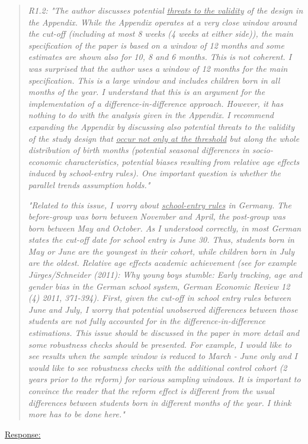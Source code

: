 \bigskip
{}
\begin{quote}
	\textit{R1.2: "The author discusses potential \underline{threats to the validity} of the design in the Appendix. While the Appendix operates at a very close window around the cut-off (including at most 8 weeks (4 weeks at either side)), the main specification of the paper is based on a window of 12 months and some estimates are shown also for 10, 8 and 6 months. This is not coherent. I was surprised that the author uses a window of 12 months for the main specification. This is a large window and includes children born in all months of the year. I understand that this is an argument for the implementation of a difference-in-difference approach. However, it has nothing to do with the analysis given in the Appendix. I recommend expanding the Appendix by discussing also potential threats to the validity of the study design that \underline{occur not only at the threshold} but along the whole distribution of birth months (potential seasonal differences in socio-economic characteristics, potential biases resulting from relative age effects induced by school-entry rules). One important question is whether the parallel trends assumption holds."}
	
	\textit{"Related to this issue, I worry about \underline{school-entry rules} in Germany. The before-group was born between November and April, the post-group was born between May and October. As I understood correctly, in most German states the cut-off date for school entry is June 30. Thus, students born in May or June are the youngest in their cohort, while children born in July are the oldest. Relative age effects academic achievement (see for example Jürges/Schneider (2011): Why young boys stumble: Early tracking, age and gender bias in the German school system, German Economic Review 12 (4) 2011, 371-394). First, given the cut-off in school entry rules between June and July, I worry that potential unobserved differences between those students are not fully accounted for in the difference-in-difference estimations. This issue should be discussed in the paper in more detail and some robustness checks should be presented. For example, I would like to see results when the sample window is reduced to March - June only and I would like to see robustness checks with the additional control cohort (2 years prior to the reform) for various sampling windows. It is important to convince the reader that the reform effect is different from the usual differences between students born in different months of the year. I think more has to be done here."}
\end{quote}
\underline{Response:}


